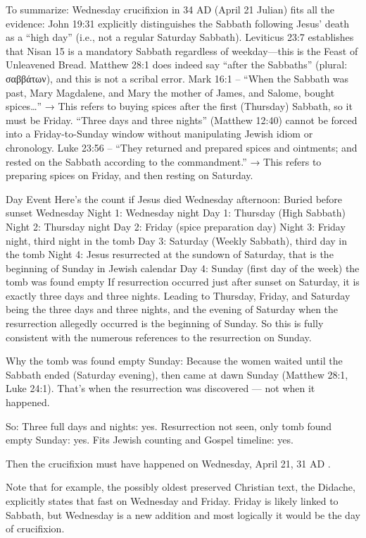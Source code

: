 To summarize: Wednesday crucifixion in 34 AD (April 21 Julian) fits all the evidence: John 19:31 explicitly distinguishes the Sabbath following Jesus' death as a ``high day'' (i.e., not a regular Saturday Sabbath).
Leviticus 23:7 establishes that Nisan 15 is a mandatory Sabbath regardless of weekday---this is the Feast of Unleavened Bread.
Matthew 28:1 does indeed say ``after the Sabbaths'' (plural: σαββάτων), and this is not a scribal error.
Mark 16:1 -- ``When the Sabbath was past, Mary Magdalene, and Mary the mother of James, and Salome, bought spices\ldots'' → This refers to buying spices after the first (Thursday) Sabbath, so it must be Friday.
``Three days and three nights'' (Matthew 12:40) cannot be forced into a Friday-to-Sunday window without manipulating Jewish idiom or chronology.
Luke 23:56 -- ``They returned and prepared spices and ointments; and rested on the Sabbath according to the commandment.'' → This refers to preparing spices on Friday, and then resting on Saturday.

Day Event Here's the count if Jesus died Wednesday afternoon: Buried before sunset Wednesday Night 1: Wednesday night Day 1: Thursday (High Sabbath) Night 2: Thursday night Day 2: Friday (spice preparation day) Night 3: Friday night, third night in the tomb Day 3: Saturday (Weekly Sabbath), third day in the tomb Night 4: Jesus resurrected at the sundown of Saturday, that is the beginning of Sunday in Jewish calendar Day 4: Sunday (first day of the week) the tomb was found empty If resurrection occurred just after sunset on Saturday, it is exactly three days and three nights.
Leading to Thursday, Friday, and Saturday being the three days and three nights, and the evening of Saturday when the resurrection allegedly occurred is the beginning of Sunday.
So this is fully consistent with the numerous references to the resurrection on Sunday.

Why the tomb was found empty Sunday: Because the women waited until the Sabbath ended (Saturday evening), then came at dawn Sunday (Matthew 28:1, Luke 24:1).
That's when the resurrection was discovered --- not when it happened.

So: Three full days and nights: yes.
Resurrection not seen, only tomb found empty Sunday: yes.
Fits Jewish counting and Gospel timeline: yes.

Then the crucifixion must have happened on Wednesday, April 21, 31 AD .

Note that for example, the possibly oldest preserved Christian text, the Didache, explicitly states that fast on Wednesday and Friday.
Friday is likely linked to Sabbath, but Wednesday is a new addition and most logically it would be the day of crucifixion.

